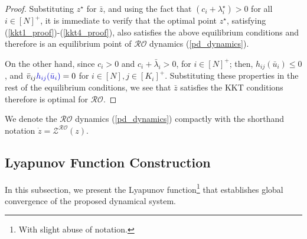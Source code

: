 \documentclass[journal,twoside,web]{ieeecolor}
\newcommand{\rev}[1]{\textcolor{revisionblue}{#1}}
\begin{document}
\begin{proof}
Substituting $z^\star$ for $\bar{z}$, and using the fact that $(c_i+\lambda_i^\star)>0$ for all $i\in[N]^+$, it is immediate to verify that the optimal point $z^\star$, satisfying (\ref{kkt1_proof})-(\ref{kkt4_proof}), also satisfies the above equilibrium conditions and therefore is an equilibrium point of $\mathcal{RO}$ dynamics (\ref{pd_dynamics}).

On the other hand, since $c_i> 0$ and $c_i+\bar{\lambda}_i>0$,  for $i\in[N]^+$; then, $h_{ij}(\bar{u}_i)\leq 0$, and $\bar{v}_{ij} \rev{h_{ij}(\bar{u}_{i})}=0$ for $i\in[N],j\in[K_i]^+$. Substituting these properties in the rest of the equilibrium conditions, we see that $\bar{z}$ satisfies the KKT conditions therefore is optimal for $\mathcal{RO}$.
\end{proof}


We denote the $\mathcal{RO}$ dynamics (\ref{pd_dynamics}) compactly with the shorthand notation $\dot z=\mathcal{Z}^{\mathcal{RO}}(z)$.

\subsection*{Lyapunov Function Construction}
In this subsection, we present the Lyapunov function\footnote{With slight abuse of notation.} that establishes global convergence of the proposed dynamical system.
\end{document}
